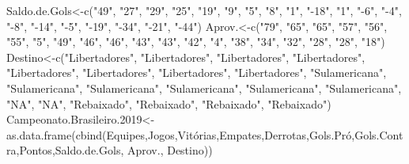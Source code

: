 \documentclass[
]{book}
\newenvironment{Shaded}{\begin{snugshade}}{\end{snugshade}}
\newcommand{\FloatTok}[1]{\textcolor[rgb]{0.00,0.00,0.81}{#1}}
\newcommand{\FunctionTok}[1]{\textcolor[rgb]{0.00,0.00,0.00}{#1}}
\newcommand{\NormalTok}[1]{#1}
\newcommand{\OtherTok}[1]{\textcolor[rgb]{0.56,0.35,0.01}{#1}}
\newcommand{\StringTok}[1]{\textcolor[rgb]{0.31,0.60,0.02}{#1}}
\begin{document}
\begin{Shaded}
\begin{Highlighting}[]
\NormalTok{Saldo.de.Gols}\OtherTok{\textless{}{-}}\FunctionTok{c}\NormalTok{(}\StringTok{"49"}\NormalTok{,  }\StringTok{"27"}\NormalTok{,   }\StringTok{"29"}\NormalTok{,   }\StringTok{"25"}\NormalTok{,   }\StringTok{"19"}\NormalTok{,   }\StringTok{"9"}\NormalTok{,    }\StringTok{"5"}\NormalTok{,    }\StringTok{"8"}\NormalTok{,    }\StringTok{"1"}\NormalTok{,    }\StringTok{"{-}18"}\NormalTok{,  }\StringTok{"1"}\NormalTok{,    }\StringTok{"{-}6"}\NormalTok{,   }\StringTok{"{-}4"}\NormalTok{,   }\StringTok{"{-}8"}\NormalTok{,   }\StringTok{"{-}14"}\NormalTok{,  }\StringTok{"{-}5"}\NormalTok{,   }\StringTok{"{-}19"}\NormalTok{,  }\StringTok{"{-}34"}\NormalTok{,  }\StringTok{"{-}21"}\NormalTok{,  }\StringTok{"{-}44"}\NormalTok{)}
\NormalTok{Aprov.}\OtherTok{\textless{}{-}}\FunctionTok{c}\NormalTok{(}\StringTok{"79"}\NormalTok{, }\StringTok{"65"}\NormalTok{,   }\StringTok{"65"}\NormalTok{,   }\StringTok{"57"}\NormalTok{,   }\StringTok{"56"}\NormalTok{,   }\StringTok{"55"}\NormalTok{,   }\StringTok{"5"}\NormalTok{,    }\StringTok{"49"}\NormalTok{,   }\StringTok{"46"}\NormalTok{,   }\StringTok{"46"}\NormalTok{,   }\StringTok{"43"}\NormalTok{,   }\StringTok{"43"}\NormalTok{,   }\StringTok{"42"}\NormalTok{,   }\StringTok{"4"}\NormalTok{,    }\StringTok{"38"}\NormalTok{,   }\StringTok{"34"}\NormalTok{,   }\StringTok{"32"}\NormalTok{,   }\StringTok{"28"}\NormalTok{,   }\StringTok{"28"}\NormalTok{,   }\StringTok{"18"}\NormalTok{)}
\NormalTok{Destino}\OtherTok{\textless{}{-}}\FunctionTok{c}\NormalTok{(}\StringTok{"Libertadores"}\NormalTok{,  }\StringTok{"Libertadores"}\NormalTok{, }\StringTok{"Libertadores"}\NormalTok{, }\StringTok{"Libertadores"}\NormalTok{, }\StringTok{"Libertadores"}\NormalTok{, }\StringTok{"Libertadores"}\NormalTok{, }\StringTok{"Libertadores"}\NormalTok{, }\StringTok{"Libertadores"}\NormalTok{, }\StringTok{"Sulamericana"}\NormalTok{, }\StringTok{"Sulamericana"}\NormalTok{, }\StringTok{"Sulamericana"}\NormalTok{, }\StringTok{"Sulamericana"}\NormalTok{, }\StringTok{"Sulamericana"}\NormalTok{, }\StringTok{"Sulamericana"}\NormalTok{, }\StringTok{"NA"}\NormalTok{,   }\StringTok{"NA"}\NormalTok{,   }\StringTok{"Rebaixado"}\NormalTok{,    }\StringTok{"Rebaixado"}\NormalTok{,    }\StringTok{"Rebaixado"}\NormalTok{,    }\StringTok{"Rebaixado"}\NormalTok{)}
\NormalTok{Campeonato.Brasileiro}\FloatTok{.2019}\OtherTok{\textless{}{-}}\FunctionTok{as.data.frame}\NormalTok{(}\FunctionTok{cbind}\NormalTok{(Equipes,Jogos,Vitórias,Empates,Derrotas,Gols.Pró,Gols.Contra,Pontos,Saldo.de.Gols, Aprov., Destino))}
\end{Highlighting}
\end{Shaded}
\end{document}
